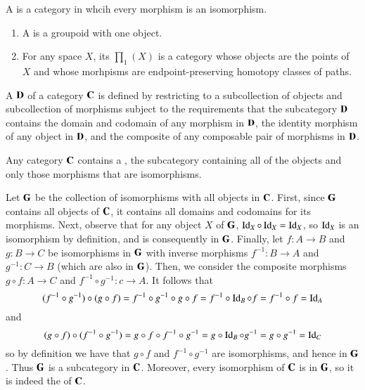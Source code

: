 \documentclass[12pt]{report}
\begin{document}
\begin{defn}{}{}
    A  is a category in whcih every morphism is an isomorphism.
\end{defn}

\begin{defn}{}{}
    \leavevmode
    \begin{enumerate}
        \item A  is a groupoid with one object.
        \item For any space $X$, its  $\prod_1(X)$ is a category whose objects are the points of $X$ and whose morhpisms are endpoint-preserving homotopy classes of paths.
    \end{enumerate}
\end{defn}

\begin{defn}{}{}
    A  $\normalfont\textbf{D}$ of a category $\normalfont\textbf{C}$ is defined by restricting to a subcollection of objects and subcollection of morphisms subject to the requirements that the subcategory $\normalfont\textbf{D}$ contains the domain and codomain of any morphism in $\normalfont\textbf{D}$, the identity morphism of any object in $\normalfont\textbf{D}$, and the composite of any composable pair of morphisms in $\normalfont\textbf{D}$.
\end{defn}


\begin{lem}{}{}
    Any category $\normalfont\textbf{C}$ contains a , the subcategory containing all of the objects and only those morphisms that are isomorphisms.
\end{lem}
\begin{proof*}{}{}
    Let $\normalfont\textbf{G}$ be the collection of isomorphisms with all objects in $\normalfont\textbf{C}$. First, since $\normalfont\textbf{G}$ contains all objects of $\normalfont\textbf{C}$, it contains all domains and codomains for its morphisms. Next, observe that for any object $X$ of $\normalfont\textbf{G}$, $\operatorname{Id}_X\circ \operatorname{Id}_X = \operatorname{Id}_X$, so $\operatorname{Id}_X$ is an isomorphism by definition, and is consequently in $\normalfont\textbf{G}$. Finally, let $f:A\rightarrow B$ and $g:B\rightarrow C$ be isomorphisms in $\normalfont\textbf{G}$ with inverse morphisms $f^{-1}:B\rightarrow A$ and $g^{-1}:C\rightarrow B$ (which are also in $\normalfont\textbf{G}$). Then, we consider the composite morphisms $g\circ f:A\rightarrow C$ and $f^{-1}\circ g^{-1}:c\rightarrow A$. It follows that \begin{equation*}
        (f^{-1}\circ g^{-1})\circ(g\circ f) = f^{-1}\circ g^{-1}\circ g\circ f = f^{-1}\circ \operatorname{Id}_B\circ f = f^{-1}\circ f = \operatorname{Id}_A
    \end{equation*}
    and \begin{equation*}
        (g\circ f)\circ (f^{-1}\circ g^{-1}) = g\circ f\circ f^{-1}\circ g^{-1} = g\circ \operatorname{Id}_B\circ g^{-1} = g\circ g^{-1} = \operatorname{Id}_C
    \end{equation*}
    so by definition we have that $g\circ f$ and $f^{-1}\circ g^{-1}$ are isomorphisms, and hence in $\normalfont\textbf{G}$. Thus $\normalfont\textbf{G}$ is a subcategory in $\normalfont\textbf{C}$. Moreover, every isomorphism of $\normalfont\textbf{C}$ is in $\normalfont\textbf{G}$, so it is indeed the  of $\normalfont\textbf{C}$.
\end{proof*}
\end{document}
